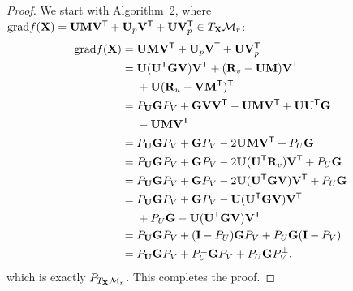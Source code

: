 \documentclass[letterpaper]{article}
\def\M{\mathcal{M}}
\def\bR{{\bf R}}
\def\U{{\bf U}}
\def\V{{\bf V}}
\def\trsp{{\sf T}}
\def\G{{\bf G}}
\def\grad{{\text{grad}}}
\def\bM{{\bf M}}
\def\bI{{\bf I}}
\def\bX{{\bf X}}
\def\bI{{\bf I}}
\def\bX{{\bf X}}
\begin{document}
\begin{proof}
  We start with Algorithm~2, where $\grad f(\bX) = \U \bM \V^{\trsp} + \U_{p} \V^{\trsp} + \U \V_{p}^{\trsp} \in T_{\bX}\M_{r}$:
  \begin{align}\label{eq:proof_lemma1}
    \grad f(\bX) & = \U \bM \V^{\trsp} + \U_{p} \V^{\trsp} + \U \V_{p}^{\trsp}  \nonumber \\
                 & = \U(\U^{\trsp} \G \V) \V^{\trsp} + (\bR_{v} - \U \bM) \V^{\trsp}  \nonumber \\
                 & ~~~~ + \U (\bR_{u} - \V \bM^{\trsp})^{\trsp} \nonumber \\
                 & = P_{\U} \G P_{V} + \G \V \V^{\trsp} - \U \bM \V^{\trsp} + \U \U^{\trsp} \G \nonumber \\
                 & ~~~~ - \U \bM \V^{\trsp} \nonumber \\
                 & = P_{\U} \G P_{V} + \G P_{V} - 2\U \bM \V^{\trsp} + P_{U} \G  \nonumber \\
                 & = P_{\U} \G P_{V} + \G P_{V} - 2\U (\U^{\trsp} \bR_{v}) \V^{\trsp} + P_{U} \G  \nonumber \\
                 & = P_{\U} \G P_{V} + \G P_{V} - 2\U (\U^{\trsp} \G \V) \V^{\trsp} + P_{U} \G  \nonumber \\
                 & = P_{\U} \G P_{V} + \G P_{V} - \U (\U^{\trsp} \G \V) \V^{\trsp}  \nonumber \\
                 & ~~~~ + P_{U} \G - \U (\U^{\trsp} \G \V) \V^{\trsp}  \nonumber \\
                 & = P_{\U} \G P_{V} + (\bI - P_{U}) \G P_{V} + P_{U} \G (\bI - P_{V})  \nonumber \\
                 & = P_{\U} \G P_{V} + P_{U}^{\perp} \G P_{V} + P_{U} \G P_{V}^{\perp}  ,
  \end{align}
  \noindent
  which is exactly $P_{T_{\bX}\M_{r}}$.
  This completes the proof.
\end{proof}

\fi
\end{document}
